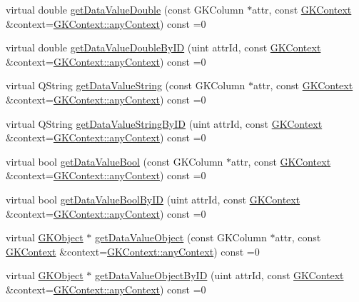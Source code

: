 \begin{DoxyCompactItemize}
\item 
virtual double \hyperlink{classGKBaseObject_ab31d8734b5c82b7872da7c28caccc535}{get\+Data\+Value\+Double} (const G\+K\+Column $\ast$attr, const \hyperlink{classGKContext}{G\+K\+Context} \&context=\hyperlink{classGKContext_a37de2dc1b6bab087b9b92a445922e79d}{G\+K\+Context\+::any\+Context}) const =0
\item 
virtual double \hyperlink{classGKBaseObject_a406a839bc0dc4ddf5eaae9a0e63ee5ef}{get\+Data\+Value\+Double\+By\+ID} (uint attr\+Id, const \hyperlink{classGKContext}{G\+K\+Context} \&context=\hyperlink{classGKContext_a37de2dc1b6bab087b9b92a445922e79d}{G\+K\+Context\+::any\+Context}) const =0
\item 
virtual Q\+String \hyperlink{classGKBaseObject_aa849b95c5b9e0556816edf4b4fa69487}{get\+Data\+Value\+String} (const G\+K\+Column $\ast$attr, const \hyperlink{classGKContext}{G\+K\+Context} \&context=\hyperlink{classGKContext_a37de2dc1b6bab087b9b92a445922e79d}{G\+K\+Context\+::any\+Context}) const =0
\item 
virtual Q\+String \hyperlink{classGKBaseObject_a75be29d474546eb09fb80aff39b631b3}{get\+Data\+Value\+String\+By\+ID} (uint attr\+Id, const \hyperlink{classGKContext}{G\+K\+Context} \&context=\hyperlink{classGKContext_a37de2dc1b6bab087b9b92a445922e79d}{G\+K\+Context\+::any\+Context}) const =0
\item 
virtual bool \hyperlink{classGKBaseObject_aa3eef7d9327e171508cc917895f45152}{get\+Data\+Value\+Bool} (const G\+K\+Column $\ast$attr, const \hyperlink{classGKContext}{G\+K\+Context} \&context=\hyperlink{classGKContext_a37de2dc1b6bab087b9b92a445922e79d}{G\+K\+Context\+::any\+Context}) const =0
\item 
virtual bool \hyperlink{classGKBaseObject_a64d5f12b34818f5d001dbd4e0e73de0d}{get\+Data\+Value\+Bool\+By\+ID} (uint attr\+Id, const \hyperlink{classGKContext}{G\+K\+Context} \&context=\hyperlink{classGKContext_a37de2dc1b6bab087b9b92a445922e79d}{G\+K\+Context\+::any\+Context}) const =0
\item 
virtual \hyperlink{classGKObject}{G\+K\+Object} $\ast$ \hyperlink{classGKBaseObject_a85b9abf441b0854648e884a88c25f0ba}{get\+Data\+Value\+Object} (const G\+K\+Column $\ast$attr, const \hyperlink{classGKContext}{G\+K\+Context} \&context=\hyperlink{classGKContext_a37de2dc1b6bab087b9b92a445922e79d}{G\+K\+Context\+::any\+Context}) const =0
\item 
virtual \hyperlink{classGKObject}{G\+K\+Object} $\ast$ \hyperlink{classGKBaseObject_a09d9039d3185b14fc0d5dd8e207b3c8d}{get\+Data\+Value\+Object\+By\+ID} (uint attr\+Id, const \hyperlink{classGKContext}{G\+K\+Context} \&context=\hyperlink{classGKContext_a37de2dc1b6bab087b9b92a445922e79d}{G\+K\+Context\+::any\+Context}) const =0

\end{DoxyCompactItemize}
